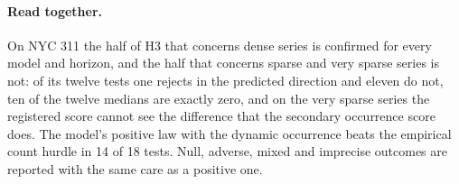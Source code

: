 \paragraph{Read together.} On NYC 311 the half of H3 that concerns dense series is confirmed for every
model and horizon, and the half that concerns sparse and very sparse series is not: of its twelve tests one
rejects in the predicted direction and eleven do not, ten of the twelve medians are exactly zero, and on the
very sparse series the registered score cannot see the difference that the secondary occurrence score does.
The model's positive law with the dynamic occurrence beats the empirical count hurdle in 14 of 18 tests.
Null, adverse, mixed and imprecise outcomes are reported with the same care as a positive one.
